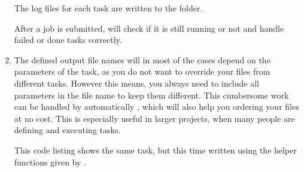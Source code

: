 \documentclass[letterpaper,10pt,english]{sphinxmanual}
\begin{document}
\begin{enumerate}
\begin{sphinxVerbatim}[commandchars=\\\{\}]
            

    
\end{sphinxVerbatim}

The log files for each task are written to the  folder.

After a job is submitted,  will check if it is still running or not and handle failed or done tasks correctly.

\item {} 
The defined output file names will in most of the cases depend on the parameters of the task, as
you do not want to override your files from different tasks.
However this means, you always need to include all parameters in the file name to keep them different.
This cumbersome work can be handled by  automatically ,
which will also help you ordering your files at no cost.
This is especially useful in larger projects, when many people are defining and executing tasks.

This code listing shows the same task, but this time written using the helper
functions given by .

\begin{sphinxVerbatim}[commandchars=\\\{\},numbers=left,firstnumber=1,stepnumber=1]
 
 


 
      

     
         

     
          


\end{sphinxVerbatim}
\end{enumerate}
\end{document}
